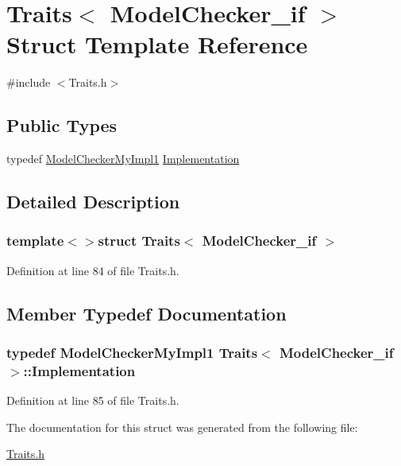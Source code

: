\hypertarget{struct_traits_3_01_model_checker__if_01_4}{\section{Traits$<$ Model\-Checker\-\_\-if $>$ Struct Template Reference}
\label{struct_traits_3_01_model_checker__if_01_4}
}


{\ttfamily \#include $<$Traits.\-h$>$}

\subsection*{Public Types}
\begin{DoxyCompactItemize}
\item 
typedef \hyperlink{class_model_checker_my_impl1}{Model\-Checker\-My\-Impl1} \hyperlink{struct_traits_3_01_model_checker__if_01_4_aa969b0d5a3092d9a06c83185140de59b}{Implementation}
\end{DoxyCompactItemize}


\subsection{Detailed Description}
\subsubsection*{template$<$$>$struct Traits$<$ Model\-Checker\-\_\-if $>$}



Definition at line 84 of file Traits.\-h.



\subsection{Member Typedef Documentation}
\hypertarget{struct_traits_3_01_model_checker__if_01_4_aa969b0d5a3092d9a06c83185140de59b}{
\subsubsection[{Implementation}]{\setlength{\rightskip}{0pt plus 5cm}typedef {\bf Model\-Checker\-My\-Impl1} {\bf Traits}$<$ {\bf Model\-Checker\-\_\-if} $>$\-::{\bf Implementation}}}\label{struct_traits_3_01_model_checker__if_01_4_aa969b0d5a3092d9a06c83185140de59b}


Definition at line 85 of file Traits.\-h.



The documentation for this struct was generated from the following file\-:\begin{DoxyCompactItemize}
\item 
\hyperlink{_traits_8h}{Traits.\-h}\end{DoxyCompactItemize}
